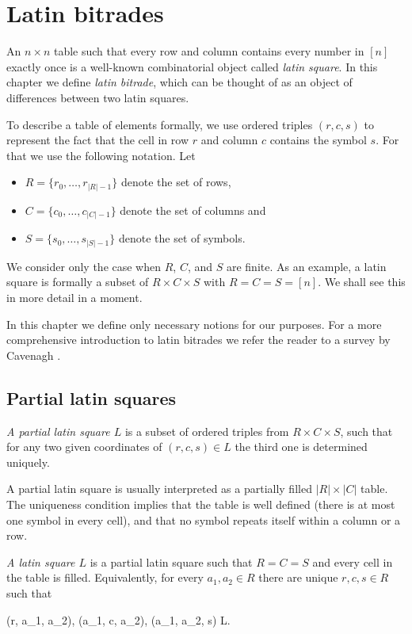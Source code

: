 \chapter{Latin bitrades}
\label{chap:bitrades}

An $n \times n$ table such that every row and column contains every number in $[n]$ exactly once is a well-known combinatorial object called \emph{latin square}. In this chapter we define \emph{latin bitrade}, which can be thought of as an object of differences between two latin squares.

To describe a table of elements formally, we use ordered triples $(r,c,s)$ to represent the fact that the cell in row $r$ and column $c$ contains the symbol $s$. For that we use the following notation. Let
\begin{itemize}
	\item $R = \{r_0,\dots,r_{|R|-1}\}$ denote the set of rows,
	\item $C = \{c_0,\dots,c_{|C|-1}\}$ denote the set of columns and
	\item $S = \{s_0,\dots,s_{|S|-1}\}$ denote the set of symbols.
\end{itemize}
We consider only the case when $R$, $C$, and $S$ are finite. As an example, a latin square is formally a subset of $R \times C \times S$ with $R = C = S = [n]$. We shall see this in more detail in a moment.

In this chapter we define only necessary notions for our purposes. For a more comprehensive introduction to latin bitrades we refer the reader to a survey by Cavenagh \cite{Cavenagh08}.

\section{Partial latin squares}

\begin{defn}
\emph{A partial latin square $L$} is a subset of ordered triples from $R \times C \times S$, such that for any two given coordinates of $(r,c,s)\in L$ the third one is determined uniquely.
\end{defn}

A partial latin square is usually interpreted as a partially filled $|R| \times |C|$ table. The uniqueness condition implies that the table is well defined (there is at most one symbol in every cell), and that no symbol repeats itself within a column or a row.

\begin{defn}
\emph{A latin square $L$} is a partial latin square such that $R=C=S$ and every cell in the table is filled. Equivalently, for every $a_1, a_2 \in R$ there are unique $r,c,s \in R$ such that
\begin{cosyeqnarray}
	(r, a_1, a_2), (a_1, c, a_2), (a_1, a_2, s) \in L.
\end{cosyeqnarray}
\end{defn}

